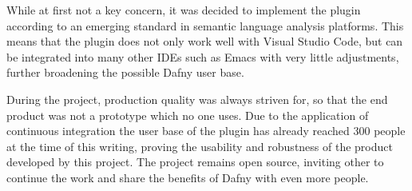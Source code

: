 While at first not a key concern, it was decided to implement the plugin according to an emerging standard in semantic language analysis platforms. This means that the plugin does not only work well with Visual Studio Code, but can be integrated into many other IDEs such as Emacs with very little adjustments, further broadening the possible Dafny user base. \newline

During the project, production quality was always striven for, so that the end product was not a prototype which no one uses. Due to the application of continuous integration the user base of the plugin has already reached 300 people at the time of this writing, proving the usability and robustness of the product developed by this project. The project remains open source, inviting other to continue the work and share the benefits of Dafny with even more people. \newline